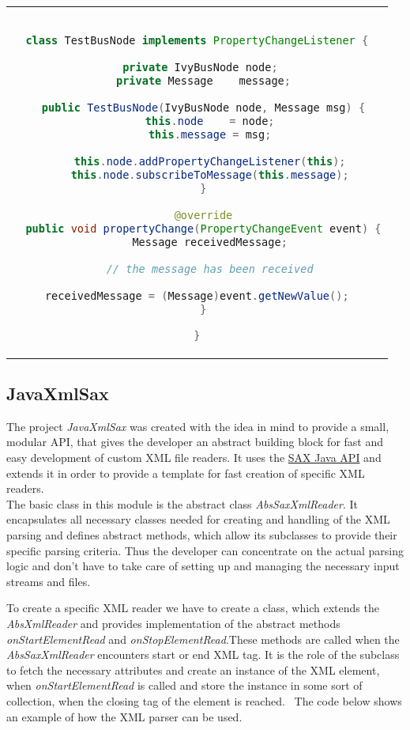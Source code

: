 \begin{center}
\begin{tabular}{c}
\begin{lstlisting}[basicstyle=\small, language=Java]

class TestBusNode implements PropertyChangeListener {
  
  private IvyBusNode node; 
  private Message    message;
  
  public TestBusNode(IvyBusNode node, Message msg) {
    this.node    = node;
    this.message = msg;
    
    this.node.addPropertyChangeListener(this);
    this.node.subscribeToMessage(this.message);
  }
  
  @override
  public void propertyChange(PropertyChangeEvent event) {
    Message receivedMessage;
    
    // the message has been received
        
    receivedMessage = (Message)event.getNewValue();    
  }

}

\end{lstlisting}
\end{tabular}
\end{center}


\subsection{JavaXmlSax}
\label{sec:xmlImplementation}

The project \textit{JavaXmlSax} was created with the idea in mind to provide a small, modular API, that gives the developer an abstract building block for fast and easy development of custom XML file readers. It uses the \href{http://www.saxproject.org/}{SAX Java API} and extends it in order to provide a template for fast creation of specific XML readers.\\
The basic class in this module is the abstract class \textit{AbsSaxXmlReader}. It encapsulates all necessary classes needed for creating and handling of the XML parsing and defines abstract methods, which allow its subclasses to provide their specific parsing criteria. Thus the developer can concentrate on the actual parsing logic and don't have to take care of setting up and managing the necessary input streams and files.\

To create a specific XML reader we have to create a class, which extends the \textit{AbsXmlReader} and provides implementation of the abstract methods \textit{onStartElementRead} and \textit{onStopElementRead}.These methods are called when the \textit{AbsSaxXmlReader} encounters start or end XML tag. It is the role of the subclass to fetch the necessary attributes and create an instance of the XML element, when \textit{onStartElementRead} is called and store the instance in some sort of collection, when the closing tag of the element is reached. \
The code below shows an example of how the XML parser can be used.

